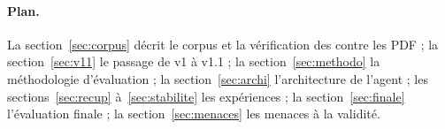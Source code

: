 \paragraph{Plan.} La section~\ref{sec:corpus} décrit le corpus et la vérification des  contre les PDF ;
la section~\ref{sec:v11} le passage de v1 à v1.1 ; la section~\ref{sec:methodo} la méthodologie d'évaluation ;
la section~\ref{sec:archi} l'architecture de l'agent ; les sections~\ref{sec:recup} à~\ref{sec:stabilite} les expériences ;
la section~\ref{sec:finale} l'évaluation finale ; la section~\ref{sec:menaces} les menaces à la validité.
